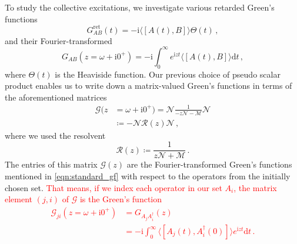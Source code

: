 \documentclass[
    reprint, 
    aps,
    preprintnumbers,
    twocolumn,
    prb,
    superscriptaddress
]{revtex4-2}
\newcommand{\im}{\mathrm{i}}
\newcommand{\mM}{\mathcal{M}}
\newcommand{\mN}{\mathcal{N}}
\begin{document}
To study the collective excitations, we investigate various retarded Green's functions 
\begin{equation}
    G_{AB}^\text{ret} (t) = - \im \langle [A(t), B] \rangle \Theta(t)\,,
\end{equation}
and their Fourier-transformed
\begin{equation}
    \label{eqn:standard_gf}
    G_{AB}(z = \omega + \im 0^+) = -\im \int_0^{\infty} e^{\im z t} \langle [A(t), B] \rangle \mathrm{d}t\,,
\end{equation}
where $\Theta(t)$ is the Heaviside function.
Our previous choice of pseudo scalar product enables us to write down a matrix-valued Green's functions in terms of the aforementioned matrices
\begin{align}
    \label{eqn:green_function}
    \mathcal{G}(z &= \omega + \im 0^+) = \mN \frac{1}{-z \mN - \mM} \mN \\
        &\coloneqq  -\mN \mathcal{R}(z) \mN\,,
\end{align}
where we used the resolvent
\begin{equation}
    \label{eqn:resolvent}
    \mathcal{R}(z) \coloneqq  \frac{1}{z \mN + \mM}\,.
\end{equation}
The entries of this matrix $\mathcal{G}(z)$ are the Fourier-transformed Green's functions mentioned in \eqref{eqn:standard_gf} with respect to the operators from the initially chosen set.
\textcolor{red}{That means, if we index each operator in our set $A_i$, the matrix element $(j,i)$ of $\mathcal{G}$ is the Green's function
\begin{align}
    \mathcal{G}_{ji}(z = \omega +\im 0^+) &=  G_{A_j A_i^\dagger} (z) \nonumber \\
        &= -\im \int_0^{\infty} \langle [A_j(t), A_i^\dagger(0)] \rangle e^{\im z t} \mathrm{d}t\,.
\end{align}}
\end{document}

